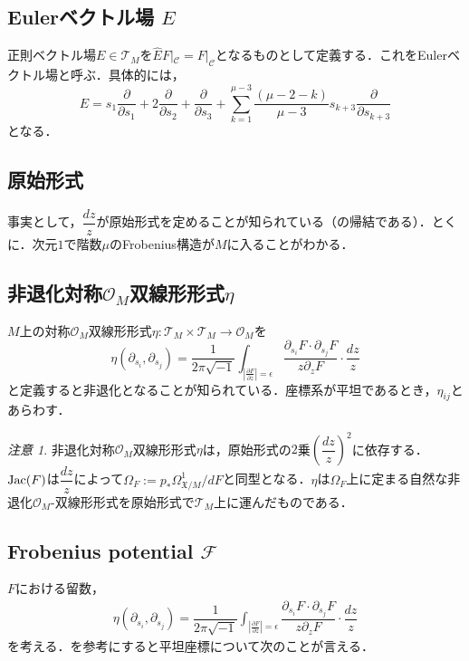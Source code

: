 \documentclass[a4paper,11pt]{jbook}
\theoremstyle{plain}
\theoremstyle{definition}
\theoremstyle{remark}
\newtheorem{rem}[thm]{注意}
\theoremstyle{proof}
\numberwithin{equation}{section}
\def\C{{\mathcal C}}
\def\F{{\mathcal F}}
\def\O{{\mathcal O}}
\def\T{{\mathcal T}}
\newcommand{\Jac}{\mathop{\rm Jac}}
\begin{document}
\subsection{Eulerベクトル場 $E$}%
	正則ベクトル場$E \in \T_M$を$\widehat{E}F|_\C = F|_\C$となるものとして定義する．これをEulerベクトル場と呼ぶ．具体的には，
$$E=s_1\dfrac{\partial}{\partial s_1}+2\dfrac{\partial}{\partial s_2}+\dfrac{\partial}{\partial s_3}+\sum_{k=1}^{\mu-3}\dfrac{(\mu-2-k)}{\mu-3}s_{k+3}\dfrac{\partial}{\partial s_{k+3}}$$
となる．


\subsection{原始形式}
	事実として，$\dfrac{dz}{z}$が原始形式を定めることが知られている（\cite{d:1, mil}の帰結である）．とくに．次元$1$で階数$\mu$のFrobenius構造が$M$に入ることがわかる．

\subsection{非退化対称$\O_M$双線形形式$\eta$}%
	$M$上の対称$\O_M$双線形形式$\eta : \T_M\times\T_M\rightarrow\O_M$を
	$$\eta(\partial_{s_i},\partial_{s_j})=\dfrac{1}{2\pi\sqrt{-1}}\int_{\left|\frac{\partial F}{\partial z}\right|=\epsilon}\dfrac{\partial_{s_i}F\cdot\partial_{s_j}F}{z\partial_zF}\cdot\dfrac{dz}{z}$$
	と定義すると非退化となることが知られている．座標系が平坦であるとき，$\eta_{ij}$とあらわす．

\begin{rem}
	非退化対称$\O_M$双線形形式$\eta$は，原始形式の$2$乗$\left(\dfrac{dz}{z}\right)^2$に依存する．$\Jac(F)$は$\dfrac{dz}{z}$によって$\Omega_F := p_*\Omega_{\mathfrak{X} / M}^1/dF$と同型となる．$\eta$は$\Omega_F$上に定まる自然な非退化$\O_M$-双線形形式を原始形式で$\T_M$上に運んだものである．
	\end{rem}

\subsection{Frobenius potential $\F$}%
	$F$における留数，
\begin{align}
\eta(\partial_{s_i},\partial_{s_j})=\dfrac{1}{2\pi\sqrt{-1}}\int_{\left|\frac{\partial F}{\partial z}\right|=\epsilon}\dfrac{\partial_{s_i}F\cdot\partial_{s_j}F}{z\partial_zF}\cdot\dfrac{dz}{z}
\end{align}
を考える．\cite[Lemma 4.3]{sat}を参考にすると平坦座標について次のことが言える．
\end{document}
